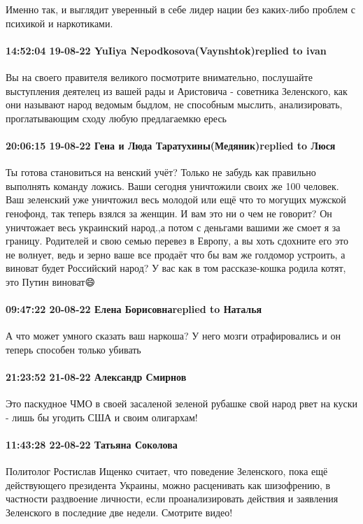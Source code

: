 Именно так, и выглядит уверенный в себе лидер нации без каких-либо проблем с
психикой и наркотиками.

\paragraph{14:52:04 19-08-22 YuIiya Nepodkosova(Vaynshtok)replied to ivan}

Вы на своего правителя великого посмотрите внимательно, послушайте выступления
деятелец из вашей рады и Аристовича - советника Зеленского, как они называют
народ ведомым быдлом, не способным мыслить, анализировать, проглатывающим сходу
любую предлагаемкю ересь

\paragraph{20:06:15 19-08-22 Гена и Люда Таратухины(Медяник)replied to Люся}

Ты готова становиться на венский учёт? Только не забудь как правильно выполнять
команду ложись. Ваши сегодня уничтожили своих же 100 человек. Ваш зеленский уже
уничтожил весь молодой или ещё что то могущих мужской генофонд, так теперь
взялся за женщин. И вам это ни о чем не говорит? Он уничтожает весь украинский
народ.,а потом с деньгами вашими же смоет я за границу. Родителей и свою семью
перевез в Европу, а вы хоть сдохните его это не волнует, ведь и зерно ваше все
продаёт что бы вам же голдомор устроить, а виноват будет Российский народ? У
вас как в том рассказе-кошка родила котят, это Путин виноват😄

\paragraph{09:47:22 20-08-22 Елена Борисовнаreplied to Наталья}

А что может умного сказать ваш наркоша? У него мозги отрафировались и он теперь
способен только убивать

\paragraph{21:23:52 21-08-22 Александр Смирнов}

Это паскудное ЧМО в своей засаленой зеленой рубашке свой народ рвет на куски -
лишь бы угодить США и своим олигархам!

\paragraph{11:43:28 22-08-22 Татьяна Соколова}

Политолог Ростислав Ищенко считает, что поведение Зеленского, пока ещё
действующего президента Украины, можно расценивать как шизофрению, в частности
раздвоение личности, если проанализировать действия и заявления Зеленского в
последние две недели.
Смотрите видео!
